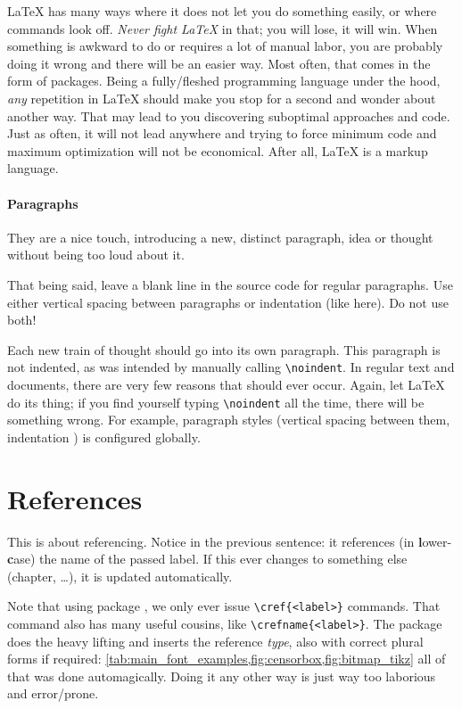 \LaTeX{} has many ways where it does not let you do something easily, or where
commands look off.
\emph{Never fight \LaTeX{}} in that; you will lose, it will win.
When something is awkward to do or requires a lot of manual labor, you are probably
doing it wrong and there will be an easier way.
Most often, that comes in the form of packages.
Being a fully\-/fleshed programming language under the hood, \emph{any} repetition
in \LaTeX{} should make you stop for a second and wonder about another way.
That may lead to you discovering suboptimal approaches and code.
Just as often, it will not lead anywhere and trying to force minimum code and
maximum optimization will not be economical.
After all, \LaTeX{} is a markup language.

\paragraph{Paragraphs}
They are a nice touch, introducing a new, distinct paragraph, idea or thought
without being too loud about it.

That being said, leave a blank line in the source code for regular paragraphs.
Use either vertical spacing between paragraphs or indentation (like here).
Do not use both!

\noindent
Each new train of thought should go into its own paragraph.
This paragraph is not indented, as was intended by manually calling \verb|\noindent|.
In regular text and documents, there are very few reasons that should ever occur.
Again, let \LaTeX{} do its thing; if you find yourself typing \verb|\noindent|
all the time, there will be something wrong.
For example, paragraph styles (vertical spacing between them, indentation )
is configured globally.

\section{References}
\label{ch:references}

This \textcolor{mRed}{} is about referencing.
Notice {\color{mRed}{\verb|\lcnamecref|}} in the previous sentence:
it references (in \textbf{l}ower-\textbf{c}ase) the name of the passed label.
If this  ever changes to something else (chapter, \dots),
it is updated automatically.

Note that using package , we only ever issue
\verb|\cref{<label>}| commands.
That command also has many useful cousins, like \verb|\crefname{<label>}|.
The package does the heavy lifting and inserts the reference \emph{type},
also with correct plural forms if required:
\cref{tab:main_font_examples,fig:censorbox,fig:bitmap_tikz}
\textleftarrow{} all of that was done automagically.
Doing it any other way is just way too laborious and error\-/prone.

